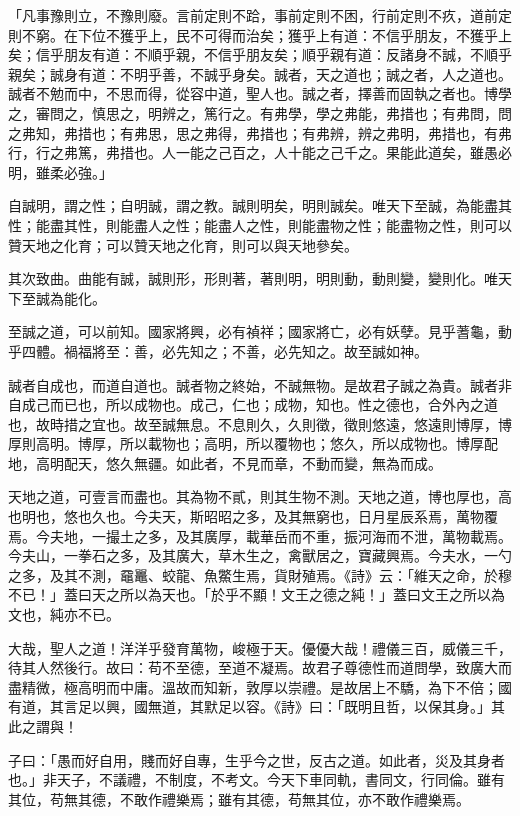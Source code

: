 \documentclass[12pt,a4paper]{ctexbook}
\begin{document}
「凡事豫則立，不豫則廢。言前定則不跲，事前定則不困，行前定則不疚，道前定則不窮。在下位不獲乎上，民不可得而治矣；獲乎上有道：不信乎朋友，不獲乎上矣；信乎朋友有道：不順乎親，不信乎朋友矣；順乎親有道：反諸身不誠，不順乎親矣；誠身有道：不明乎善，不誠乎身矣。誠者，天之道也；誠之者，人之道也。誠者不勉而中，不思而得，從容中道，聖人也。誠之者，擇善而固執之者也。博學之，審問之，慎思之，明辨之，篤行之。有弗學，學之弗能，弗措也；有弗問，問之弗知，弗措也；有弗思，思之弗得，弗措也；有弗辨，辨之弗明，弗措也，有弗行，行之弗篤，弗措也。人一能之己百之，人十能之己千之。果能此道矣，雖愚必明，雖柔必強。」\par
自誠明，謂之性；自明誠，謂之教。誠則明矣，明則誠矣。唯天下至誠，為能盡其性；能盡其性，則能盡人之性；能盡人之性，則能盡物之性；能盡物之性，則可以贊天地之化育；可以贊天地之化育，則可以與天地參矣。\par
其次致曲。曲能有誠，誠則形，形則著，著則明，明則動，動則變，變則化。唯天下至誠為能化。\par
至誠之道，可以前知。國家將興，必有禎祥；國家將亡，必有妖孽。見乎蓍龜，動乎四體。禍福將至：善，必先知之；不善，必先知之。故至誠如神。\par
誠者自成也，而道自道也。誠者物之終始，不誠無物。是故君子誠之為貴。誠者非自成己而已也，所以成物也。成己，仁也；成物，知也。性之德也，合外內之道也，故時措之宜也。故至誠無息。不息則久，久則徵，徵則悠遠，悠遠則博厚，博厚則高明。博厚，所以載物也；高明，所以覆物也；悠久，所以成物也。博厚配地，高明配天，悠久無疆。如此者，不見而章，不動而變，無為而成。\par
天地之道，可壹言而盡也。其為物不貳，則其生物不測。天地之道，博也厚也，高也明也，悠也久也。今夫天，斯昭昭之多，及其無窮也，日月星辰系焉，萬物覆焉。今夫地，一撮土之多，及其廣厚，載華岳而不重，振河海而不泄，萬物載焉。今夫山，一拳石之多，及其廣大，草木生之，禽獸居之，寶藏興焉。今夫水，一勺之多，及其不測，黿鼉、蛟龍、魚鱉生焉，貨財殖焉。《詩》云：「維天之命，於穆不已！」蓋曰天之所以為天也。「於乎不顯！文王之德之純！」蓋曰文王之所以為文也，純亦不已。\par
大哉，聖人之道！洋洋乎發育萬物，峻極于天。優優大哉！禮儀三百，威儀三千，待其人然後行。故曰：苟不至德，至道不凝焉。故君子尊德性而道問學，致廣大而盡精微，極高明而中庸。溫故而知新，敦厚以崇禮。是故居上不驕，為下不倍；國有道，其言足以興，國無道，其默足以容。《詩》曰：「既明且哲，以保其身。」其此之謂與！\par
子曰：「愚而好自用，賤而好自專，生乎今之世，反古之道。如此者，災及其身者也。」非天子，不議禮，不制度，不考文。今天下車同軌，書同文，行同倫。雖有其位，苟無其德，不敢作禮樂焉；雖有其德，苟無其位，亦不敢作禮樂焉。\par
\end{document}
